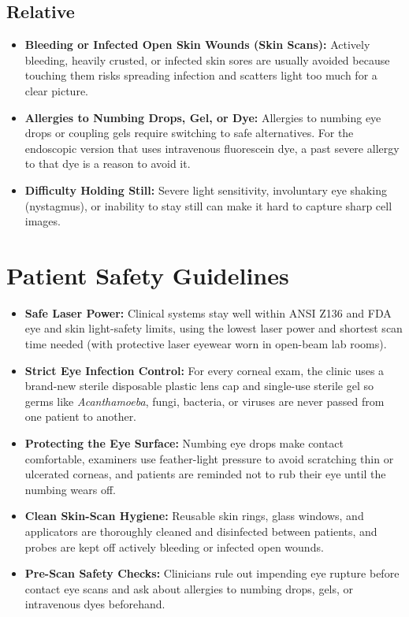 \subsection{Relative}
\begin{itemize}
    \item \textbf{Bleeding or Infected Open Skin Wounds (Skin Scans):} Actively bleeding, heavily crusted, or infected skin sores are usually avoided because touching them risks spreading infection and scatters light too much for a clear picture.
    \item \textbf{Allergies to Numbing Drops, Gel, or Dye:} Allergies to numbing eye drops or coupling gels require switching to safe alternatives. For the endoscopic version that uses intravenous fluorescein dye, a past severe allergy to that dye is a reason to avoid it.
    \item \textbf{Difficulty Holding Still:} Severe light sensitivity, involuntary eye shaking (nystagmus), or inability to stay still can make it hard to capture sharp cell images.
\end{itemize}

\section{Patient Safety Guidelines}
\begin{itemize}
    \item \textbf{Safe Laser Power:} Clinical systems stay well within ANSI Z136 and FDA eye and skin light-safety limits, using the lowest laser power and shortest scan time needed (with protective laser eyewear worn in open-beam lab rooms).
    \item \textbf{Strict Eye Infection Control:} For every corneal exam, the clinic uses a brand-new sterile disposable plastic lens cap and single-use sterile gel so germs like \textit{Acanthamoeba}, fungi, bacteria, or viruses are never passed from one patient to another.
    \item \textbf{Protecting the Eye Surface:} Numbing eye drops make contact comfortable, examiners use feather-light pressure to avoid scratching thin or ulcerated corneas, and patients are reminded not to rub their eye until the numbing wears off.
    \item \textbf{Clean Skin-Scan Hygiene:} Reusable skin rings, glass windows, and applicators are thoroughly cleaned and disinfected between patients, and probes are kept off actively bleeding or infected open wounds.
    \item \textbf{Pre-Scan Safety Checks:} Clinicians rule out impending eye rupture before contact eye scans and ask about allergies to numbing drops, gels, or intravenous dyes beforehand.
\end{itemize}

